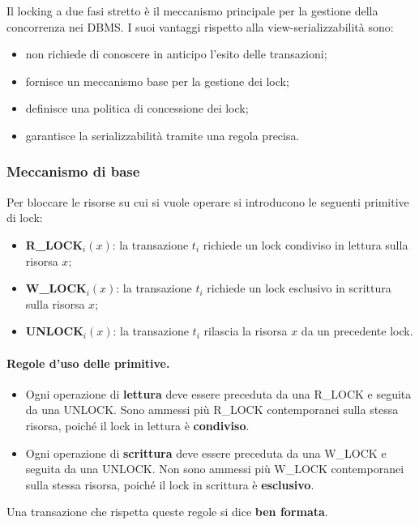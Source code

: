 Il locking a due fasi stretto è il meccanismo principale per la gestione della concorrenza nei DBMS. I suoi vantaggi rispetto alla view-serializzabilità sono:
\begin{itemize}
	\item non richiede di conoscere in anticipo l'esito delle transazioni;
	\item fornisce un meccanismo base per la gestione dei lock;
	\item definisce una politica di concessione dei lock;
	\item garantisce la serializzabilità tramite una regola precisa.
\end{itemize}

\subsubsection{Meccanismo di base}

Per bloccare le risorse su cui si vuole operare si introducono le seguenti primitive di lock:
\begin{itemize}
	\item \textbf{R\_LOCK$_i(x)$}: la transazione $t_i$ richiede un lock condiviso in lettura sulla risorsa $x$;
	\item \textbf{W\_LOCK$_i(x)$}: la transazione $t_i$ richiede un lock esclusivo in scrittura sulla risorsa $x$;
	\item \textbf{UNLOCK$_i(x)$}: la transazione $t_i$ rilascia la risorsa $x$ da un precedente lock.
\end{itemize}

\paragraph{Regole d'uso delle primitive.}
\begin{itemize}
	\item Ogni operazione di \textbf{lettura} deve essere preceduta da una R\_LOCK e seguita da una UNLOCK. Sono ammessi più R\_LOCK contemporanei sulla stessa risorsa, poiché il lock in lettura è \textbf{condiviso}.
	\item Ogni operazione di \textbf{scrittura} deve essere preceduta da una W\_LOCK e seguita da una UNLOCK. Non sono ammessi più W\_LOCK contemporanei sulla stessa risorsa, poiché il lock in scrittura è \textbf{esclusivo}.
\end{itemize}

Una transazione che rispetta queste regole si dice \textbf{ben formata}.

